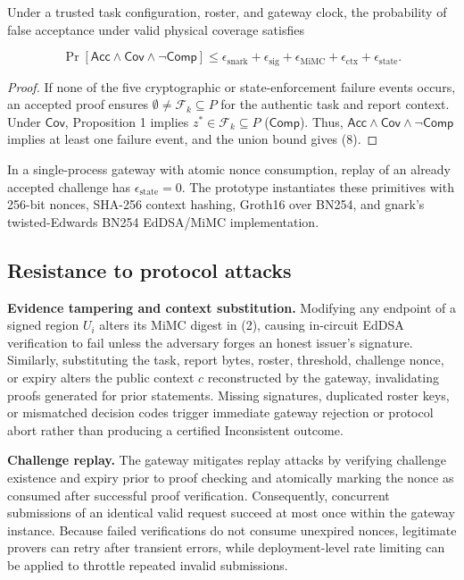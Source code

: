 \begin{proposition}\label{prop:composition}
Under a trusted task configuration, roster, and gateway clock, the probability of false acceptance under valid physical coverage satisfies

\begin{equation}\label{eq:composed}
\Pr[\mathsf{Acc} \wedge \mathsf{Cov} \wedge \neg\mathsf{Comp}] \le \epsilon_{\mathrm{snark}} + \epsilon_{\mathrm{sig}} + \epsilon_{\mathrm{MiMC}} + \epsilon_{\mathrm{ctx}} + \epsilon_{\mathrm{state}}.
\end{equation}
\end{proposition}
\begin{proof}
If none of the five cryptographic or state-enforcement failure events occurs, an accepted proof ensures $\emptyset \neq \mathcal{F}_k \subseteq P$ for the authentic task and report context. Under $\mathsf{Cov}$, Proposition 1 implies $z^* \in \mathcal{F}_k \subseteq P$ ($\mathsf{Comp}$). Thus, $\mathsf{Acc} \wedge \mathsf{Cov} \wedge \neg\mathsf{Comp}$ implies at least one failure event, and the union bound gives (8).
\end{proof}

In a single-process gateway with atomic nonce consumption, replay of an already accepted challenge has $\epsilon_{\mathrm{state}} = 0$. The prototype instantiates these primitives with 256-bit nonces, SHA-256 context hashing, Groth16 over BN254, and gnark's twisted-Edwards BN254 EdDSA/MiMC implementation.

\subsection{Resistance to protocol attacks}
\textbf{Evidence tampering and context substitution.} Modifying any endpoint of a signed region $U_i$ alters its MiMC digest in (2), causing in-circuit EdDSA verification to fail unless the adversary forges an honest issuer's signature. Similarly, substituting the task, report bytes, roster, threshold, challenge nonce, or expiry alters the public context $c$ reconstructed by the gateway, invalidating proofs generated for prior statements. Missing signatures, duplicated roster keys, or mismatched decision codes trigger immediate gateway rejection or protocol abort rather than producing a certified Inconsistent outcome.

\textbf{Challenge replay.} The gateway mitigates replay attacks by verifying challenge existence and expiry prior to proof checking and atomically marking the nonce as consumed after successful proof verification. Consequently, concurrent submissions of an identical valid request succeed at most once within the gateway instance. Because failed verifications do not consume unexpired nonces, legitimate provers can retry after transient errors, while deployment-level rate limiting can be applied to throttle repeated invalid submissions.

